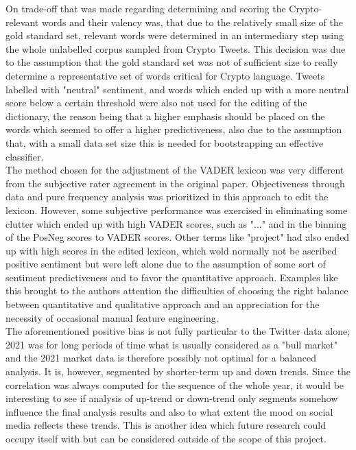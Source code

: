 \documentclass[11pt]{article}
\begin{document}
On trade-off that was made regarding determining and scoring the Crypto-relevant words and their valency was, that due to the relatively small size of the gold standard set, relevant words were determined in an intermediary step using the whole unlabelled corpus sampled from Crypto Tweets. This decision was due to the assumption that the gold standard set was not of sufficient size to really determine a representative set of words critical for Crypto language. Tweets labelled with "neutral" sentiment, and words which ended up with a more neutral score below a certain threshold were also not used for the editing of the dictionary, the reason being that a higher emphasis should be placed on the words which seemed to offer a higher predictiveness, also due to the assumption that, with a small data set size this is needed for bootstrapping an effective classifier.\\
The method chosen for the adjustment of the VADER lexicon was very different from the subjective rater agreement in the original paper. Objectiveness through data and pure frequency analysis was prioritized in this approach to edit the lexicon. However, some subjective performance was exercised in eliminating some clutter which ended up with high VADER scores, such as "..." and in the binning of the PosNeg scores to VADER scores. Other terms like "project" had also ended up with high scores in the edited lexicon, which wold normally not be ascribed positive sentiment but were left alone due to the assumption of some sort of sentiment predictiveness and to favor the quantitative approach. Examples like this brought to the authors attention the difficulties of choosing the right balance between quantitative and qualitative approach and an appreciation for the necessity of occasional manual feature engineering. \\
The aforementioned positive bias is not fully particular to the Twitter data alone; 2021 was for long periods of time what is usually considered as a "bull market" and the 2021 market data is therefore possibly not optimal for a balanced analysis. It is, however, segmented by shorter-term up and down trends. Since the correlation was always computed for the sequence of the whole year, it would be interesting to see if analysis of up-trend or down-trend only segments somehow influence the final analysis results and also to what extent the mood on social media reflects these trends. This is another idea which future research could occupy itself with but can be considered outside of the scope of this project. \\
\end{document}
